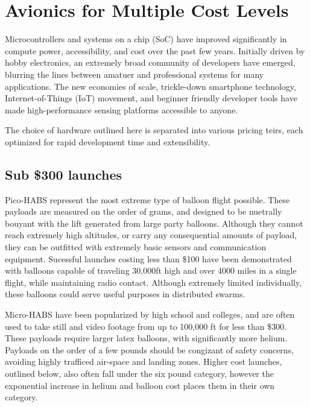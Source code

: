 \documentclass[heading.tex]{subfiles}
\begin{document}
\section{Avionics for Multiple Cost Levels}

Microcontrollers and systems on a chip (SoC) have improved significantly in 
compute power, accessibility, and cost over the past few years.
Initially driven by hobby electronics, an extremely broad community of developers
have emerged, blurring the lines between amatuer and professional systems for
many applications. The new economies of scale, trickle-down smartphone
technology, Internet-of-Things (IoT) movement, and beginner friendly developer
tools have made high-performance sensing platforms accessible to anyone.

The choice of hardware outlined here is separated into various pricing teirs,
each optimized for rapid development time and extensibility.
\subsection{Sub \$300 launches}

Pico-HABS represent the most extreme type of balloon flight possible.
These payloads are measured on the order of grams, and designed to be nuetrally
bouyant with the lift generated from large party balloons. Although they cannot
reach extremely high altitudes, or carry any consequential amounts of payload,
they can be outfitted with extremely basic sensors and communication equipment.
Sucessful launches costing less than \$100 have been demonstrated with balloons
capable of traveling 30,000ft high and over 4000 miles in a single flight,
while maintaining radio contact.
\cite{Leo} \cite{Amsat}
Although extremely limited individually,
these balloons could serve useful purposes in distributed swarms.

Micro-HABS have been popularized by high school and colleges, and are often used
to take still and video footage from up to 100,000 ft for less
than \$300. These payloads require larger latex balloons, with significantly
more helium. Payloads on the order of a few pounds should be congizant of safety
concerns, avoiding highly trafficed air-space and landing zones.
Higher cost launches, outlined below, also often fall under the six pound
category, however the exponential increase in helium and balloon cost places
them in their own category.
\end{document}
